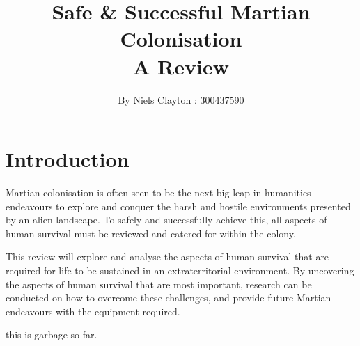 \documentclass[a4paper,11pt]{article}
\begin{document}
\title{\LARGE{\textbf{Safe \& Successful Martian Colonisation}\\A Review}}
\author{By Niels Clayton : 300437590}
\date{}
\maketitle

\section*{Introduction}
\linenumbers
Martian colonisation is often seen to be the next big leap in humanities endeavours to explore and conquer the harsh and hostile environments presented by an alien landscape. To safely and successfully achieve this, all aspects of human survival must be reviewed and catered for within the colony.

This review will explore and analyse the aspects of human survival that are required for life to be sustained in an extraterritorial environment. By uncovering the aspects of human survival that are most important, research can be conducted on how to overcome these challenges, and provide future Martian endeavours with the equipment required.

this is garbage so far.
\end{document}
